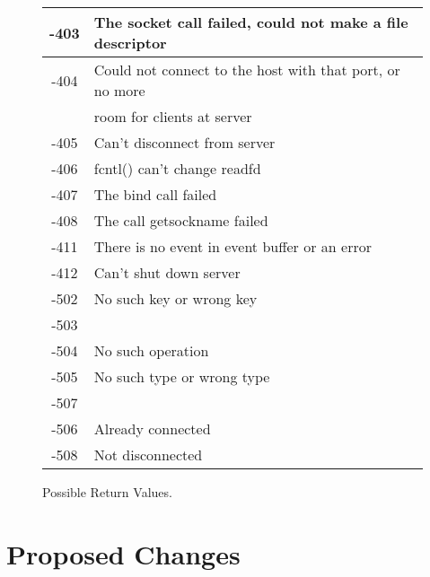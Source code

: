 \begin{figure}[htpb]
\begin{center}
\begin{tabular} {|c|l|}
      \hline 
      -403 & The socket call failed, could not make a file descriptor \\
      \hline 
      -404 & Could not connect to the host with that port, or no more \\
           & room for clients at server \\ \hline 
      -405 & Can't disconnect from server \\ \hline 
      -406 & fcntl() can't change readfd \\ \hline
      -407 & The bind call failed \\ \hline 
      -408 & The call getsockname failed \\ \hline 
      -411 & There is no event in event buffer or an error \\ \hline 
      -412 & Can't shut down server \\ \hline 
      -502 & No such key or wrong key \\ 
      -503 & \\ \hline 
      -504 & No such operation \\ \hline 
      -505 & No such type or wrong type \\ 
      -507 & \\ \hline 
      -506 & Already connected \\ \hline 
      -508 & Not disconnected \\ \hline
    \end{tabular}
  \end{center}
  \caption{\label{returnVal}Possible Return Values. }
\end{figure}
\normalsize


\newpage
\section{Proposed Changes}










